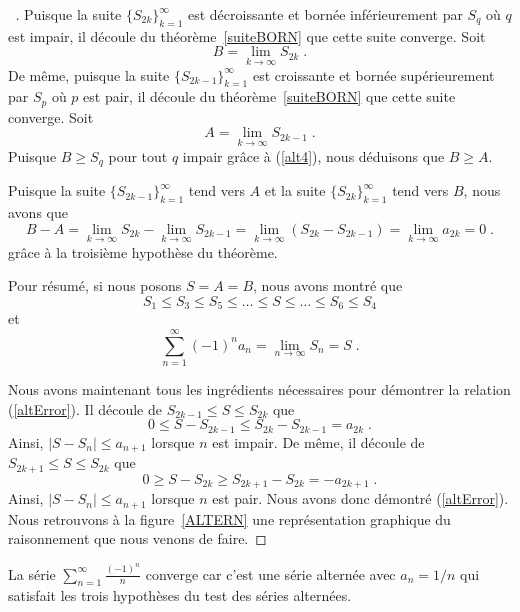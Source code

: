 {\begin{proof}[\UOproof\ \theory]
Puisque la suite $\{S_{2k}\}_{k=1}^\infty$ est décroissante et bornée
inférieurement par $S_q$ où $q$ est impair, il découle du
théorème~\ref{suiteBORN} que cette suite converge.  Soit
\[
B = \lim_{k\rightarrow \infty} S_{2k} \; .
\]
De même, puisque la suite $\{S_{2k-1}\}_{k=1}^\infty$ est croissante et
bornée supérieurement par $S_p$ où $p$ est pair, il découle du
théorème~\ref{suiteBORN} que cette suite converge.  Soit
\[
A = \lim_{k\rightarrow \infty} S_{2k-1} \; .
\]
Puisque $B \geq S_q$ pour tout $q$ impair grâce à (\ref{alt4}), nous
déduisons que $B \geq A$.

Puisque la suite $\{S_{2k-1}\}_{k=1}^\infty$ tend vers $A$ et la
suite $\{S_{2k}\}_{k=1}^\infty$ tend vers $B$, nous avons que
\[
B-A = \lim_{k\rightarrow \infty} S_{2k} - \lim_{k\rightarrow \infty} S_{2k-1}
= \lim_{k\rightarrow \infty} \left( S_{2k} - S_{2k-1} \right)
= \lim_{k\rightarrow \infty} a_{2k} =0 \; .
\]
grâce à la troisième hypothèse du théorème.

Pour résumé, si nous posons $S=A=B$, nous avons montré que
\[
S_1 \leq S_3 \leq S_5 \leq \ldots \leq S \leq \ldots \leq S_6 \leq S_4
\]
et
\[
\sum_{n=1}^\infty (-1)^n a_n = \lim_{n\rightarrow \infty} S_n = S \; .
\]

Nous avons maintenant tous les ingrédients nécessaires pour démontrer la
relation (\ref{altError}).  Il découle de $S_{2k-1} \leq S \leq S_{2k}$
que
\[
0 \leq S - S_{2k-1} \leq S_{2k} - S_{2k-1} = a_{2k} \; .
\]
Ainsi, $|S- S_n| \leq a_{n+1}$ lorsque $n$ est impair.  De même, il
découle de $S_{2k+1} \leq S \leq S_{2k}$ que
\[
0 \geq S - S_{2k} \geq S_{2k+1} - S_{2k} = -a_{2k+1} \; .
\]
Ainsi, $|S-S_n| \leq a_{n+1}$ lorsque $n$ est pair.  Nous avons donc démontré
(\ref{altError}).  Nous retrouvons à la figure~\ref{ALTERN} une
représentation graphique du raisonnement que nous venons de faire.
\end{proof}


\begin{egg}
La série $\displaystyle \sum_{n=1}^\infty \frac{(-1)^n}{n}$ converge
car c'est une série alternée avec $a_n = 1/n$ qui satisfait les trois
hypothèses du test des séries alternées.
\end{egg}

}
